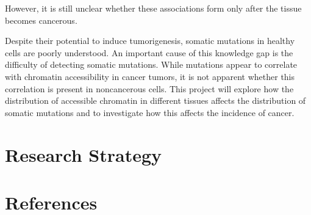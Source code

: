 \documentclass[12pt]{article}
\begin{document}
However, it is still unclear whether these associations form only after the tissue becomes cancerous. 




Despite their potential to induce tumorigenesis, somatic mutations in healthy cells are poorly understood.
An important cause of this knowledge gap is the difficulty of detecting somatic mutations.
While mutations appear to correlate with chromatin accessibility in cancer tumors, it is not apparent whether this correlation is present in noncancerous cells.
This project will explore how the distribution of accessible chromatin in different tissues affects the distribution of somatic mutations and to investigate how this affects the incidence of cancer.



\section{Research Strategy} %





\section{References} %
\end{document}
